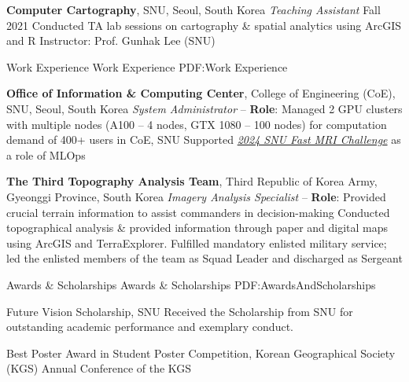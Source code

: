 \documentclass[letterpaper,MMMyyyy,nonstopmode]{simpleresumecv}
\begin{document}
\begin{Body}
\BigGap
\Entry

\textbf{Computer Cartography}, SNU, Seoul, South Korea
\Gap
\textit{      Teaching Assistant}
\hfill
Fall 2021
\Gap
\SubBulletItem
Conducted TA lab sessions on cartography \& spatial analytics using ArcGIS and R
\Gap
\SubBulletItem
Instructor: Prof. Gunhak Lee (SNU)



\Section
{Work Experience}
{Work Experience}
{PDF:Work Experience}

\Entry
\textbf{Office of Information \& Computing Center}, College of Engineering (CoE), SNU, Seoul, South Korea
\Gap
\textit{       System Administrator}
\hfill
{} --
\Gap
\SubBulletItem
\textbf{Role}: Managed 2 GPU clusters with multiple nodes (A100 – 4 nodes, GTX 1080 – 100 nodes) for computation demand of 400+ users in CoE, SNU
\Gap
\SubBulletItem
Supported \textit{\href{https://fastmri.snu.ac.kr/}{2024 SNU Fast MRI Challenge}} as a role of MLOps
\BigGap


\Entry
\textbf{The Third Topography Analysis Team}, Third Republic of Korea Army, Gyeonggi Province, South Korea
\Gap
\textit{      Imagery Analysis Specialist}
\hfill
{} --
\Gap
\SubBulletItem
\textbf{Role}: Provided crucial terrain information to assist commanders in decision-making
\Gap
\SubBulletItem
Conducted topographical analysis \& provided information through paper and digital maps using ArcGIS and TerraExplorer.
\Gap
\SubBulletItem
Fulfilled mandatory enlisted military service; led the enlisted members of the team as Squad Leader and discharged as Sergeant



\Section
{Awards \&\newline
Scholarships}
{Awards \& Scholarships}
{PDF:AwardsAndScholarships}


\BulletItem
Future Vision Scholarship, SNU
\hfill
{}
\Gap
\SubBulletItem
Received the Scholarship from SNU for outstanding academic performance and exemplary conduct.
\BigGap

\BulletItem
Best Poster Award in Student Poster Competition, Korean Geographical Society (KGS)
\hfill
{}
\Gap
{} Annual Conference of the KGS
\BigGap


\end{Body}
\end{document}
